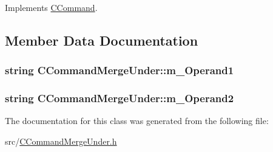 Implements \hyperlink{classCCommand_ad9361ea814093c4ebecf22bb0a3f8b79}{C\+Command}.



\subsection{Member Data Documentation}
\subsubsection[{\texorpdfstring{m\+\_\+\+Operand1}{m_Operand1}}]{\setlength{\rightskip}{0pt plus 5cm}string C\+Command\+Merge\+Under\+::m\+\_\+\+Operand1\hspace{0.3cm}{\ttfamily [private]}}\hypertarget{classCCommandMergeUnder_abeada56729aa197e14779621c7eb03c0}{}\label{classCCommandMergeUnder_abeada56729aa197e14779621c7eb03c0}
\subsubsection[{\texorpdfstring{m\+\_\+\+Operand2}{m_Operand2}}]{\setlength{\rightskip}{0pt plus 5cm}string C\+Command\+Merge\+Under\+::m\+\_\+\+Operand2\hspace{0.3cm}{\ttfamily [private]}}\hypertarget{classCCommandMergeUnder_adfb43ee9af1ba4ba89e49b63a08b0cba}{}\label{classCCommandMergeUnder_adfb43ee9af1ba4ba89e49b63a08b0cba}


The documentation for this class was generated from the following file\+:\begin{DoxyCompactItemize}
\item 
src/\hyperlink{CCommandMergeUnder_8h}{C\+Command\+Merge\+Under.\+h}\end{DoxyCompactItemize}

